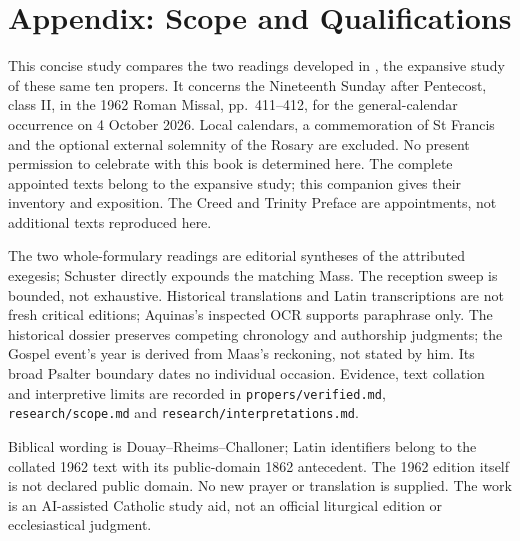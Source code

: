 \section{Appendix: Scope and Qualifications}

This concise study compares the two readings developed in , the expansive study of these same ten propers.
It concerns the Nineteenth Sunday after Pentecost, class II, in the
1962 Roman Missal, pp.~411--412, for the general-calendar occurrence
on 4 October 2026. Local calendars, a commemoration of St Francis and
the optional external solemnity of the Rosary are excluded. No present
permission to celebrate with this book is determined here. The complete
appointed texts belong to the expansive study; this companion gives
their inventory and exposition. The Creed and Trinity Preface are
appointments, not additional texts reproduced here.

The two whole-formulary readings are editorial syntheses of the
attributed exegesis; Schuster directly expounds the matching Mass.
The reception sweep is bounded, not exhaustive. Historical translations
and Latin transcriptions are not fresh critical editions; Aquinas's
inspected OCR supports paraphrase only. The historical dossier preserves
competing chronology and authorship judgments; the Gospel event's year
is derived from Maas's reckoning, not stated by him. Its broad Psalter
boundary dates no individual occasion.
Evidence, text collation and interpretive limits are recorded in
\texttt{propers/verified.md}, \texttt{research/scope.md} and
\texttt{research/interpretations.md}.

Biblical wording is Douay--Rheims--Challoner; Latin identifiers belong
to the collated 1962 text with its public-domain 1862 antecedent.
The 1962 edition itself is not declared public domain. No new prayer
or translation is supplied. The work is an AI-assisted Catholic study
aid, not an official liturgical edition or ecclesiastical judgment.

